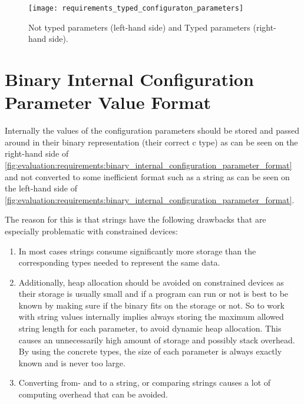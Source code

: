 \begin{figure}[H]
    \centering
    \texttt{[image: requirements\_typed\_configuraton\_parameters]}
    \caption{Not typed parameters (left-hand side) and Typed parameters (right-hand side).}
    \label{fig:evaluation:requirements:typed_configuration_parameters}
\end{figure}

\section{Binary Internal Configuration Parameter Value Format}
\label{sec:requirements:binary_internal_configuration_parameter_format}

Internally the values of the configuration parameters should be stored and passed around in their binary representation (their correct c type) as can be seen on the right-hand side of \autoref{fig:evaluation:requirements:binary_internal_configuration_parameter_format} and not converted to some inefficient format such as a string as can be seen on the left-hand side of \autoref{fig:evaluation:requirements:binary_internal_configuration_parameter_format}.

The reason for this is that strings have the following drawbacks that are especially problematic with constrained devices:

\begin{enumerate}
    \item In most cases strings consume significantly more storage than the corresponding types needed to represent the same data.

    \item Additionally, heap allocation should be avoided on constrained devices as their storage is usually small and if a program can run or not is best to be known by making sure if the binary fits on the storage or not.
          So to work with string values internally implies always storing the maximum allowed string length for each parameter, to avoid dynamic heap allocation.
          This causes an unnecessarily high amount of storage and possibly stack overhead.
          By using the concrete types, the size of each parameter is always exactly known and is never too large.

    \item Converting from- and to a string, or comparing strings causes a lot of computing overhead that can be avoided.
\end{enumerate}

